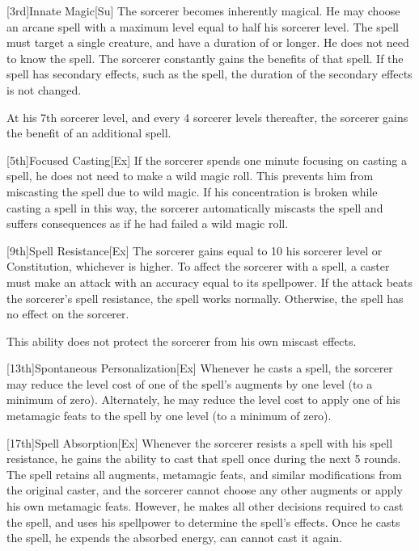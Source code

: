 [3rd]{Innate Magic}[Su]
The sorcerer becomes inherently magical.
He may choose an arcane spell with a maximum level equal to half his sorcerer level.
The spell must target a single creature, and have a duration of \durshort or longer.
He does not need to know the spell.
The sorcerer constantly gains the benefits of that spell.
If the spell has secondary effects, such as the  spell, the duration of the secondary effects is not changed.

At his 7th sorcerer level, and every 4 sorcerer levels thereafter, the sorcerer gains the benefit of an additional spell.

[5th]{Focused Casting}[Ex]
If the sorcerer spends one minute focusing on casting a spell, he does not need to make a wild magic roll.
This prevents him from miscasting the spell due to wild magic.
If his concentration is broken while casting a spell in this way, the sorcerer automatically miscasts the spell and suffers consequences as if he had failed a wild magic roll.

[9th]{Spell Resistance}[Ex]
The sorcerer gains  equal to 10 \add his sorcerer level or Constitution, whichever is higher.
To affect the sorcerer with a spell, a caster must make an attack with an accuracy equal to its spellpower.
If the attack beats the sorcerer's spell resistance, the spell works normally.
Otherwise, the spell has no effect on the sorcerer.

This ability does not protect the sorcerer from his own miscast effects.

[13th]{Spontaneous Personalization}[Ex]
Whenever he casts a spell, the sorcerer may reduce the level cost of one of the spell's augments by one level (to a minimum of zero).
Alternately, he may reduce the level cost to apply one of his metamagic feats to the spell by one level (to a minimum of zero).

[17th]{Spell Absorption}[Ex]
Whenever the sorcerer resists a spell with his spell resistance, he gains the ability to cast that spell once during the next 5 rounds.
The spell retains all augments, metamagic feats, and similar modifications from the original caster, and the sorcerer cannot choose any other augments or apply his own metamagic feats.
However, he makes all other decisions required to cast the spell, and uses his spellpower to determine the spell's effects.
Once he casts the spell, he expends the absorbed energy, can cannot cast it again.

